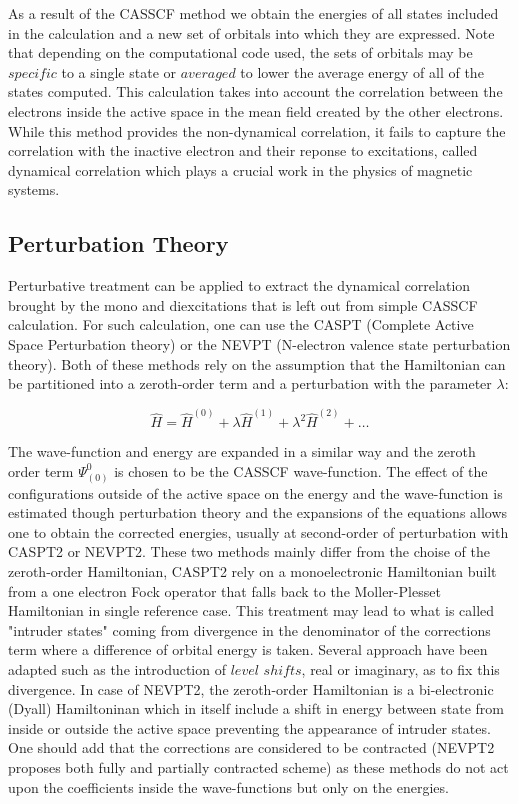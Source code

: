 \documentclass[12pt]{report}
\numberwithin{equation}{section}
\begin{document}
As a result of the CASSCF method we obtain the energies of all states included in the calculation and a new set of orbitals into which they are expressed.
Note that depending on the computational code used, the sets of orbitals may be $specific$ to a single state or $averaged$ to lower the average energy of all of the states computed.
This calculation takes into account the correlation between the electrons inside the active space in the mean field created by the other electrons. 
While this method provides the non-dynamical correlation, it fails to capture the correlation with the inactive electron and their reponse to excitations, called dynamical correlation which plays a crucial work in the physics of magnetic systems.


\subsection{Perturbation Theory}

Perturbative treatment can be applied to extract the dynamical correlation brought by the mono and diexcitations that is left out from simple CASSCF calculation. For such calculation, one can use the CASPT (Complete Active Space Perturbation theory)
or the NEVPT (N-electron valence state perturbation theory). Both of these methods rely on the assumption that the Hamiltonian can be partitioned into a zeroth-order term and a perturbation with the parameter $\lambda$:

\begin{equation}
    \hat{H}=\hat{H}^{(0)}+\lambda\hat{H}^{(1)}+\lambda^2 \hat{H}^{(2)}+\ldots
\end{equation}


The wave-function and energy are expanded in a similar way and the zeroth order term $\Psi_{(0)}^{0}$ is chosen to be the CASSCF wave-function. 
The effect of the configurations outside of the active space on the energy and the wave-function is estimated though perturbation theory and the expansions of the equations allows one to obtain the corrected energies,
usually at second-order of perturbation with CASPT2 or NEVPT2. These two methods mainly differ from the choise of the zeroth-order Hamiltonian, CASPT2 rely on a monoelectronic Hamiltonian built from a one electron Fock operator that falls back to the Moller-Plesset Hamiltonian in single reference case. 
This treatment may lead to what is called "intruder states" coming from divergence in the denominator of the corrections term where a difference of orbital energy is taken. Several approach have been adapted such as the introduction of  $level$ $shifts$, real or imaginary, as to fix this divergence.
In case of NEVPT2, the zeroth-order Hamiltonian is a bi-electronic (Dyall) Hamiltoninan which in itself include a shift in energy between state from inside or outside the active space preventing the appearance of intruder states.
One should add that the corrections are considered to be contracted (NEVPT2 proposes both fully and partially contracted scheme) as these methods do not act upon the coefficients inside the wave-functions but only on the energies.
\end{document}
